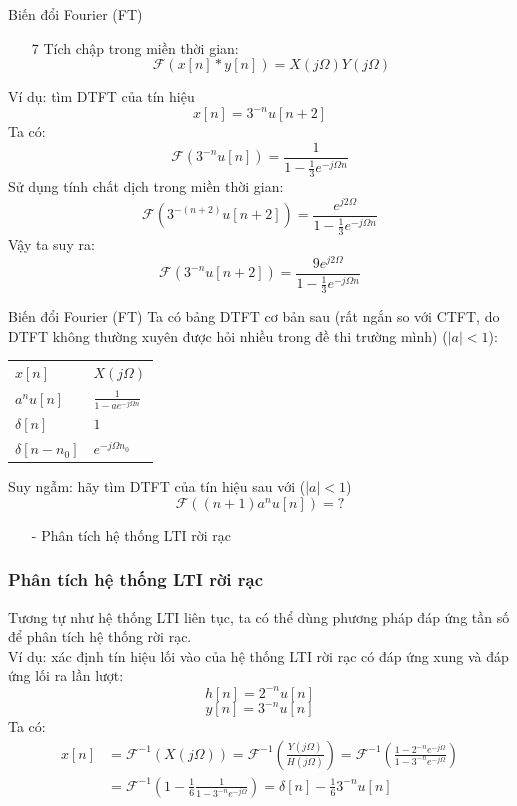 \documentclass[8pt]{beamer}
\begin{document}
\begin{frame}{Biến đổi Fourier (FT)}
\begin{enumerate}
	\item[7] \alert{Tích chập trong miền thời gian:}
		\alert{$$\mathscr{F}(x[n]*y[n])=X(j\Omega)Y(j\Omega)$$}
\end{enumerate}
Ví dụ: tìm DTFT của tín hiệu
$$x[n]=3^{-n}u[n+2]$$
Ta có: 
$$\mathscr{F}(3^{-n}u[n])=\frac{1}{1-\frac{1}{3}e^{-j\Omega n}}$$
Sử dụng tính chất dịch trong miền thời gian:
$$\mathscr{F}(3^{-(n+2)}u[n+2])=\frac{e^{j2\Omega}}{1-\frac{1}{3}e^{-j\Omega n}}$$
Vậy ta suy ra:
$$\mathscr{F}(3^{-n}u[n+2])=\frac{9e^{j2\Omega}}{1-\frac{1}{3}e^{-j\Omega n}}$$
\end{frame}
\begin{frame}{Biến đổi Fourier (FT)}
Ta có bảng DTFT cơ bản sau (rất ngắn so với CTFT, do DTFT không thường xuyên được hỏi nhiều trong đề thi trường mình) ($|a|<1$):
\begin{center}
\begin{tabular}{ |l|l| } 
 \hline
 $x[n]$ & $X(j\Omega)$\\ 
 $a^{n}u[n]$ & $\frac{1}{1-ae^{-j\Omega n}}$ \\ 
 $\delta[n]$ & $1$ \\ 
 $\delta[n-n_{0}]$ & $e^{-j\Omega n_{0}}$\\
 \hline
\end{tabular}
\end{center}
Suy ngẫm: hãy tìm DTFT của tín hiệu sau với ($|a|<1$)
$$\mathscr{F}((n+1)a^n u[n])=?$$
\begin{itemize}
	\item[-] Phân tích hệ thống LTI rời rạc
\end{itemize}
\subsubsection{Phân tích hệ thống LTI rời rạc}
Tương tự như hệ thống LTI liên tục, ta có thể dùng phương pháp đáp ứng tần số để phân tích hệ thống rời rạc.
\\ Ví dụ: xác định tín hiệu lối vào của hệ thống LTI rời rạc có đáp ứng xung và đáp ứng lối ra lần lượt: $$h[n]=2^{-n}u[n]$$ $$y[n]=3^{-n}u[n]$$
Ta có: 
\begin{equation*}
\begin{split}
	x[n]&=\mathscr{F}^{-1}(X(j\Omega))=\mathscr{F}^{-1}\left(\frac{Y(j\Omega)}{H(j\Omega)}\right)=\mathscr{F}^{-1}\left(\frac{1-2^{-n}e^{-j\Omega}}{1-3^{-n}e^{-j\Omega}}\right)\\
	    &=\mathscr{F}^{-1}\left(1-\frac{1}{6}\frac{1}{1-3^{-n}e^{-j\Omega}}\right)=\delta[n]-\frac{1}{6}3^{-n}u[n]
\end{split}
\end{equation*}
\end{frame}
\end{document}
